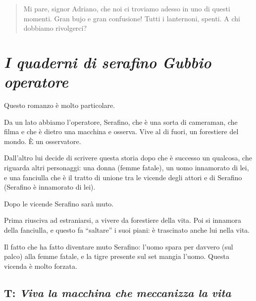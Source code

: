 \documentclass[a4paper, twoside, titlepage]{book}
\begin{document}
\begin{quotation}
Mi pare, signor Adriano, che noi ci troviamo adesso in uno di questi momenti. Gran bujo e gran confusione! Tutti i lanternoni, spenti. A chi dobbiamo rivolgerci?
\end{quotation}

\chapter{\textit{I quaderni di serafino Gubbio operatore}}

Questo romanzo è molto particolare.

Da un lato abbiamo l’operatore, Serafino, che è una sorta di cameraman, che filma e che è dietro una macchina e osserva. Vive al di fuori, un forestiere del mondo.
È un osservatore.

Dall’altro lui decide di scrivere questa storia dopo che è successo un qualcosa, che riguarda altri personaggi: una donna (femme fatale), un uomo innamorato di lei, e una fanciulla che è il tratto di unione tra le vicende degli attori e di Serafino (Serafino è innamorato di lei).

Dopo le vicende Serafino sarà muto.

Prima riusciva ad estraniarsi, a vivere da forestiere della vita. Poi si innamora della fanciulla, e questo fa “saltare” i suoi piani: è trascinato anche lui nella vita.

Il fatto che ha fatto diventare muto Serafino: l’uomo spara per davvero (sul palco) alla femme fatale, e la tigre presente sul set mangia l’uomo.
Questa vicenda è molto forzata.

\section{T: \textit{Viva la macchina che meccanizza la vita}}
\end{document}
